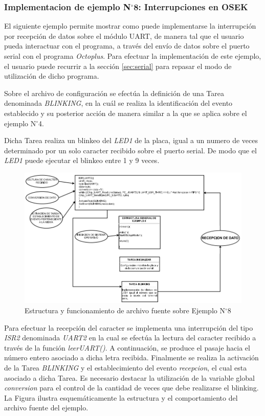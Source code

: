 \documentclass[12pt,letterpaper]{article}
\begin{document}
\subsubsection{Implementacion de ejemplo N$^{\circ}$8: Interrupciones en OSEK}
El siguiente ejemplo permite mostrar como puede implementarse la interrupción por recepción de datos sobre el módulo UART, de manera tal que el usuario pueda interactuar con el programa, a través del envío de datos sobre el puerto serial con el programa \textit{Octoplus}. Para efectuar la implementación de este ejemplo, el usuario puede recurrir a la sección \ref{sec:serial} para repasar el modo de utilización de dicho programa.

Sobre el archivo de configuración se efectúa la definición de una Tarea denominada \textit{BLINKING}, en la cuál se realiza la identificación del evento establecido y su posterior acción de manera similar a la que se aplica sobre el ejemplo N$^{\circ}$4. 

Dicha Tarea realiza un blinkeo del \textit{LED1} de la placa, igual a un numero de veces determinado por un solo caracter recibido sobre el puerto serial. De modo que el \textit{LED1} puede ejecutar el blinkeo entre 1 y 9 veces.
\begin{center}
\begin{figure}[!h]
\centering
\includegraphics[width=15 cm]{figuras/f39.png}
\caption{Estructura y funcionamiento de archivo fuente sobre Ejemplo N$^{\circ}$8}
\label{Fig46}
\end{figure}
\end{center}
Para efectuar la recepción del caracter se implementa una interrupción del tipo \textit{ISR2} denominada \textit{UART2} en la cual se efectúa la lectura del caracter recibido a través de la función \textit{leerUART()}. A continuación, se produce el pasaje hacia el número entero asociado a dicha letra recibida. Finalmente se realiza la activación de la Tarea \textit{BLINKING} y el establecimiento del evento \textit{recepcion}, el cual esta asociado a dicha Tarea. Es necesario destacar la utilización de la variable global \textit{conversion} para el control de la cantidad de veces que debe realizarse el blinking. La Figura  ilustra esquemáticamente la estructura y el comportamiento del archivo fuente del ejemplo.
\end{document}

